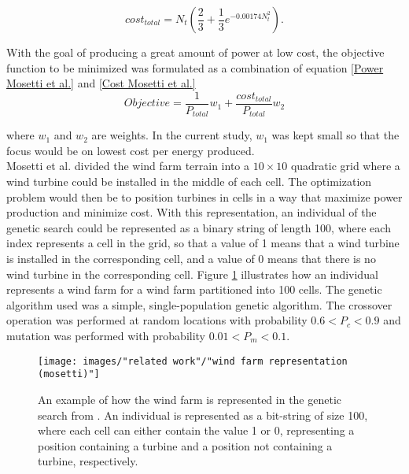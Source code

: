 \begin{equation}
\label{Cost Mosetti et al.}
cost_{total} = N_t \left( \frac{2}{3} + \frac{1}{3}e^{-0.00174N_t^2} \right).
\end{equation}

\noindent With the goal of producing a great amount of power at low cost, the objective function to be minimized was formulated as a combination of equation \ref{Power Mosetti et al.} and \ref{Cost Mosetti et al.}\\


\begin{equation}
Objective = \frac{1}{P_{total}}w_1 + \frac{cost_{total}}{P_{total}}w_2
\label{Objective function Mosetti et al.}
\end{equation}


\noindent where $w_1$ and $w_2$ are weights. In the current study, $w_1$ was kept small so that the focus would be on lowest cost per energy produced. \\

\noindent Mosetti et al. divided the wind farm terrain into a $10\times10$ quadratic grid where a wind turbine could be installed in the middle of each cell. The optimization problem would then be to position turbines in cells in a way that maximize power production and minimize cost. With this representation, an individual of the genetic search could be represented as a binary string of length 100, where each index represents a cell in the grid, so that a value of 1 means that a wind turbine is installed in the corresponding cell, and a value of 0 means that there is no wind turbine in the corresponding cell. Figure \ref{Wind Farm Representation} illustrates how an individual represents a wind farm for a wind farm partitioned into 100 cells. The genetic algorithm used was a simple, single-population genetic algorithm. The crossover operation was performed at random locations with probability $0.6 < P_c < 0.9$ and mutation was performed with probability $0.01 < P_m < 0.1$. \\


\begin{figure}[h!]
\begin{center}
\texttt{[image: images/"related work"/"wind farm representation (mosetti)"]}
\caption{An example of how the wind farm is represented in the genetic search from \cite{Mosetti}. An individual is represented as a bit-string of size 100, where each cell can either contain the value 1 or 0, representing a position containing a turbine and a position not containing a turbine, respectively.}
\label{Wind Farm Representation}
\end{center}
\end{figure}



